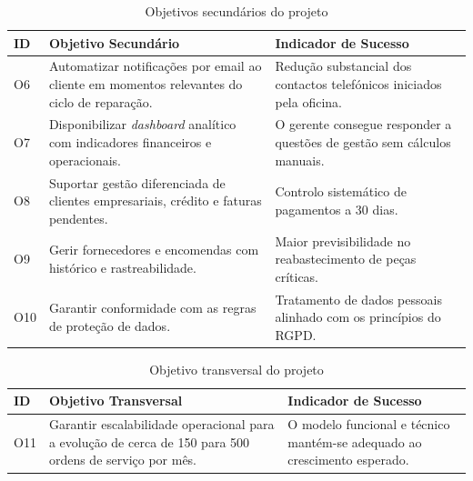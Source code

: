 \documentclass[a4paper,12pt]{scrreprt}
\begin{document}
        \begin{table}[H]
            \centering
            \small
            \begin{tabular}{|p{1.3cm}|p{8cm}|p{5cm}|}
                \hline
                \rowcolor{gray!20!white}
                \textbf{ID} & \textbf{Objetivo Secundário} & \textbf{Indicador de Sucesso} \\
                \hline
                O6 & Automatizar notificações por email ao cliente em momentos relevantes do ciclo de reparação. & Redução substancial dos contactos telefónicos iniciados pela oficina. \\
                \hline
                O7 & Disponibilizar \textit{dashboard} analítico com indicadores financeiros e operacionais. & O gerente consegue responder a questões de gestão sem cálculos manuais. \\
                \hline
                O8 & Suportar gestão diferenciada de clientes empresariais, crédito e faturas pendentes. & Controlo sistemático de pagamentos a 30 dias. \\
                \hline
                O9 & Gerir fornecedores e encomendas com histórico e rastreabilidade. & Maior previsibilidade no reabastecimento de peças críticas. \\
                \hline
                O10 & Garantir conformidade com as regras de proteção de dados. & Tratamento de dados pessoais alinhado com os princípios do RGPD. \\
                \hline
            \end{tabular}
            \caption{Objetivos secundários do projeto}
        \end{table}

        \begin{table}[H]
            \centering
            \small
            \begin{tabular}{|p{1.3cm}|p{8cm}|p{5cm}|}
                \hline
                \rowcolor{gray!20!white}
                \textbf{ID} & \textbf{Objetivo Transversal} & \textbf{Indicador de Sucesso} \\
                \hline
                O11 & Garantir escalabilidade operacional para a evolução de cerca de 150 para 500 ordens de serviço por mês. & O modelo funcional e técnico mantém-se adequado ao crescimento esperado. \\
                \hline
            \end{tabular}
            \caption{Objetivo transversal do projeto}
        \end{table}
\end{document}
